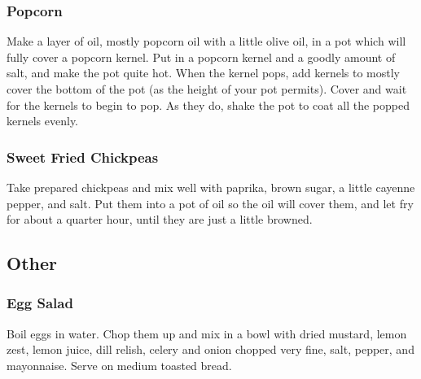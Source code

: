 \documentclass[10pt]{article}
\begin{document}
\subsubsection*{Popcorn}

Make a layer of oil, mostly popcorn oil with a little olive oil, in a pot which will fully cover a popcorn kernel.
Put in a popcorn kernel and a goodly amount of salt, and make the pot quite hot.
When the kernel pops, add kernels to mostly cover the bottom of the pot (as the height of your pot permits).
Cover and wait for the kernels to begin to pop.
As they do, shake the pot to coat all the popped kernels evenly.

\subsubsection*{Sweet Fried Chickpeas}

Take prepared chickpeas and mix well with paprika, brown sugar, a little cayenne pepper, and salt.
Put them into a pot of oil so the oil will cover them, and let fry for about a quarter hour, until they are just a little browned.

\subsection*{Other}

\subsubsection*{Egg Salad}

Boil eggs in water.
Chop them up and mix in a bowl with dried mustard, lemon zest, lemon juice, dill relish, celery and onion chopped very fine, salt, pepper, and mayonnaise.
Serve on medium toasted bread.
\end{document}
